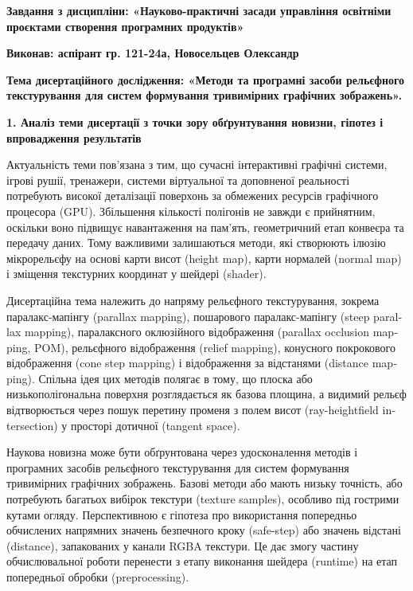 \documentclass[14pt,a4paper]{extarticle}
\newcommand{\eng}[1]{\foreignlanguage{english}{#1}}
\newcommand{\sectiontitle}[1]{%
  \par\vspace{\baselineskip}%
  \noindent\textbf{#1}\par
}
\begin{document}
\begin{center}
\textbf{Завдання з дисципліни: «Науково-практичні засади управління освітніми проєктами створення програмних продуктів»}
\end{center}

\noindent\textbf{Виконав: аспірант гр. 121-24а, Новосельцев Олександр}

\noindent\textbf{Тема дисертаційного дослідження: «Методи та програмні засоби рельєфного текстурування для систем формування тривимірних графічних зображень».}

\sectiontitle{1. Аналіз теми дисертації з точки зору обґрунтування новизни, гіпотез і впровадження результатів}

Актуальність теми пов'язана з тим, що сучасні інтерактивні графічні системи, ігрові рушії, тренажери, системи віртуальної та доповненої реальності потребують високої деталізації поверхонь за обмежених ресурсів графічного процесора (\eng{GPU}). Збільшення кількості полігонів не завжди є прийнятним, оскільки воно підвищує навантаження на пам'ять, геометричний етап конвеєра та передачу даних. Тому важливими залишаються методи, які створюють ілюзію мікрорельєфу на основі карти висот (\eng{height map}), карти нормалей (\eng{normal map}) і зміщення текстурних координат у шейдері (\eng{shader}).

Дисертаційна тема належить до напряму рельєфного текстурування, зокрема паралакс-мапінгу (\eng{parallax mapping}), пошарового паралакс-мапінгу (\eng{steep parallax mapping}), паралаксного оклюзійного відображення (\eng{parallax occlusion mapping}, POM), рельєфного відображення (\eng{relief mapping}), конусного покрокового відображення (\eng{cone step mapping}) і відображення за відстанями (\eng{distance mapping}). Спільна ідея цих методів полягає в тому, що плоска або низькополігональна поверхня розглядається як базова площина, а видимий рельєф відтворюється через пошук перетину променя з полем висот (\eng{ray-heightfield intersection}) у просторі дотичної (\eng{tangent space}).

Наукова новизна може бути обґрунтована через удосконалення методів і програмних засобів рельєфного текстурування для систем формування тривимірних графічних зображень. Базові методи або мають низьку точність, або потребують багатьох вибірок текстури (\eng{texture samples}), особливо під гострими кутами огляду. Перспективною є гіпотеза про використання попередньо обчислених напрямних значень безпечного кроку (\eng{safe-step}) або значень відстані (\eng{distance}), запакованих у канали RGBA текстури. Це дає змогу частину обчислювальної роботи перенести з етапу виконання шейдера (\eng{runtime}) на етап попередньої обробки (\eng{preprocessing}).
\end{document}
